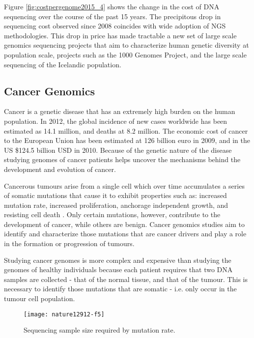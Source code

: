 Figure \ref{fig:costpergenome2015_4} shows the change in the cost of DNA sequencing over the course of the past 15 years. The precipitous drop in sequencing cost observed since 2008 coincides with wide adoption of NGS methodologies. This drop in price has made tractable a new set of large scale genomics sequencing projects that aim to characterize human genetic diversity at population scale, projects such as the 1000 Genomes Project\autocite{10002010map}, and the large scale sequencing of the Icelandic population\autocite{gudbjartsson2015large}.

\subsection{Cancer Genomics}
Cancer is a genetic disease that has an extremely high burden on the human population. In 2012, the global incidence of new cases worldwide has been estimated as 14.1 million, and deaths at 8.2 million\autocite{torre2015global}. The economic cost of cancer to the European Union has been estimated at 126 billion euro in 2009\autocite{luengo2013economic}, and in the US \$124.5 billion USD in 2010\autocite{yabroff2011economic}. Because of the genetic nature of the disease studying genomes of cancer patients helps uncover the mechanisms behind the development and evolution of cancer\autocite{stratton2009cancer}.

Cancerous tumours arise from a single cell which over time accumulates a series of somatic mutations that cause it to exhibit properties such as: increased mutation rate, increased proliferation, anchorage independent growth, and resisting cell death\autocite{hanahan2011hallmarks} . Only certain mutations, however, contribute to the development of cancer, while others are benign. Cancer genomics studies aim to identify and characterize those mutations that are cancer drivers and play a role in the formation or progression of tumours\autocite{stratton2009cancer}. 

Studying cancer genomes is more complex and expensive than studying the genomes of healthy individuals because each patient requires that two DNA samples are collected - that of the normal tissue, and that of the tumour. This is necessary to identify those mutations that are somatic - i.e. only occur in the tumour cell population\autocite{roberts2013comparative}.


\begin{figure}[H]
\texttt{[image: nature12912-f5]}
\centering
\caption {Sequencing sample size required by mutation rate\autocite{lawrence2014discovery}.}
\label{fig:nature12912-f5}
\end{figure}

